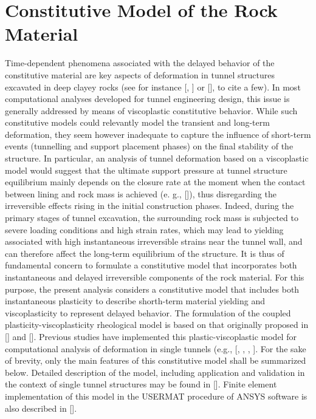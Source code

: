 \documentclass[a4paper,fleqn]{cas-sc}
\begin{document}
\section{Constitutive Model of the Rock Material}\label{}

Time-dependent phenomena associated with the delayed behavior of the constitutive material are key aspects of deformation in tunnel structures excavated in deep clayey rocks (see for instance [, ] or [], to cite a few). In most computational analyses developed for tunnel engineering design, this issue is generally addressed by means of viscoplastic constitutive behavior. While such constitutive models could relevantly model the transient and long-term deformation, they seem however inadequate to capture the influence of short-term events (tunnelling and support placement phases) on the final stability of the structure. In particular, an analysis of tunnel deformation based on a viscoplastic model would suggest that the ultimate support pressure at tunnel structure equilibrium mainly depends on the closure rate at the moment when the contact between lining and rock mass is achieved (e. g., []), thus disregarding the irreversible effects rising in the initial construction phases. Indeed, during the primary stages of tunnel excavation, the surrounding rock mass is subjected to severe loading conditions and high strain rates, which may lead to yielding associated with high instantaneous irreversible strains near the tunnel wall, and can therefore affect the long-term equilibrium of the structure. It is thus of fundamental concern to formulate a constitutive model that incorporates both instantaneous and delayed irreversible components of the rock material. For this purpose, the present analysis considers a constitutive model that includes both instantaneous plasticity to describe shorth-term material yielding and viscoplasticity to represent delayed behavior. The formulation of the coupled plasticity-viscoplasticity rheological model is based on that originally proposed in [] and []. Previous studies have implemented this plastic-viscoplastic model for computational analysis of deformation in single tunnels (e.g., [, , , ]. For the sake of brevity, only the main features of this constitutive model shall be summarized below.  Detailed description of the model, including application and validation in the context of single tunnel structures may be found in []. Finite element implementation of this model in the USERMAT procedure of  ANSYS software is also described in [].
\end{document}
